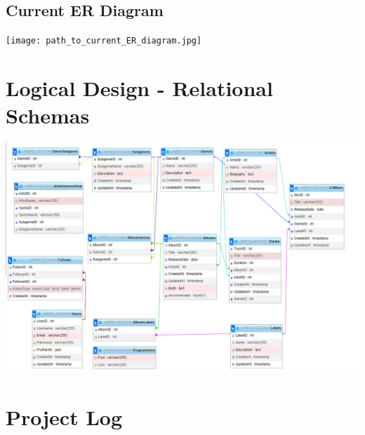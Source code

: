 \documentclass{article}
\begin{document}
\subsection{Current ER Diagram}
\texttt{[image: path\_to\_current\_ER\_diagram.jpg]}

\section{Logical Design - Relational Schemas}

\includegraphics[width=\linewidth]{relational_schema.png}


\section{Project Log}
\begin{table}[h!]
    \centering
    \resizebox{\textwidth}{!}{%
      
    }
  \end{table}
\end{document}
